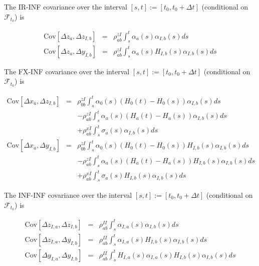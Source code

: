 \documentclass[12pt, a4paper]{article}
\begin{document}
\begin{appendix}
The IR-INF covariance over the interval $[s,t] := [t_0, t_0+\Delta t]$ (conditional on $\mathcal{F}_{t_0}$) is

\begin{eqnarray*}
  \mathrm{Cov}[ \Delta z_a, \Delta z_{I,b} ] & = & \rho_{ab}^{zI} \int_s^t \alpha_a(s) \alpha_{I,b}(s) ds \\
  \mathrm{Cov}[ \Delta z_a, \Delta y_{I,b} ] & = & \rho_{ab}^{zI} \int_s^t \alpha_a(s) H_{I,b}(s) \alpha_{I,b}(s) ds
\end{eqnarray*}

The FX-INF covariance over the interval $[s,t] := [t_0, t_0+\Delta t]$ (conditional on $\mathcal{F}_{t_0}$) is

\begin{eqnarray*}
  \mathrm{Cov}[ \Delta x_a, \Delta z_{I,b} ] & = & \rho_{0b}^{zI} \int_s^t \alpha_0(s) (H_0(t)-H_0(s)) \alpha_{I,b}(s) ds \\
                                             & & -\rho_{ab}^{zI} \int_s^t \alpha_a(s)(H_a(t)-H_a(s))\alpha_{I,b}(s) ds \\
                                             & & +\rho_{ab}^{xI}\int_s^t \sigma_a(s) \alpha_{I,b}(s) ds \\
  \mathrm{Cov}[ \Delta x_a, \Delta y_{I,b} ] & = & \rho_{0b}^{zI} \int_s^t \alpha_0(s) (H_0(t)-H_0(s)) H_{I,b}(s)\alpha_{I,b}(s) ds \\
                                             & & -\rho_{ab}^{zI} \int_s^t \alpha_a(s)(H_a(t)-H_a(s))H_{I,b}(s)\alpha_{I,b}(s) ds \\
                                             & & +\rho_{ab}^{xI}\int_s^t \sigma_a(s) H_{I,b}(s)\alpha_{I,b}(s) ds
\end{eqnarray*}

The INF-INF covariance over the interval $[s,t] := [t_0, t_0+\Delta t]$ (conditional on $\mathcal{F}_{t_0}$) is

\begin{eqnarray*}
  \mathrm{Cov}[ \Delta z_{I,a}, \Delta z_{I,b} ] & = & \rho_{ab}^{II} \int_s^t \alpha_{I,a}(s) \alpha_{I,b}(s) ds \\
  \mathrm{Cov}[ \Delta z_{I,a}, \Delta y_{I,b} ] & = & \rho_{ab}^{II} \int_s^t \alpha_{I,a}(s) H_{I,b}(s)
                                                       \alpha_{I,b}(s) ds \\
  \mathrm{Cov}[ \Delta y_{I,a}, \Delta y_{I,b} ] & = & \rho_{ab}^{II} \int_s^t H_{I,a}(s) \alpha_{I,a}(s) H_{I,b}(s) \alpha_{I,b}(s) ds
\end{eqnarray*}


\end{appendix}
\end{document}
